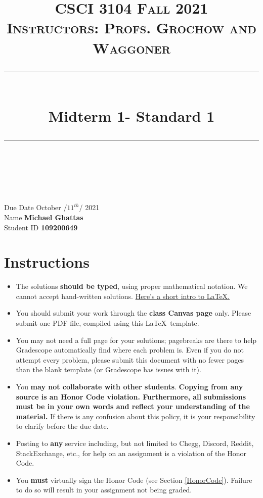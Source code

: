 \documentclass[11pt]{article}
\title{
\normalfont \normalsize 
\textsc{CSCI 3104 Fall 2021 \\ 
Instructors: Profs. Grochow and Waggoner} \\
[10pt] 
\rule{\linewidth}{0.5pt} \\[6pt] 
\huge Midterm 1- Standard 1 \\
\rule{\linewidth}{2pt}  \\[10pt]
}
\date{}
\theoremstyle{definition}
\theoremstyle{definition}
\theoremstyle{definition}
\begin{document}
\maketitle


\noindent
Due Date \dotfill October /$11^{th}$/ 2021 \\
Name \dotfill \textbf{Michael Ghattas} \\
Student ID \dotfill \textbf{109200649} \\


\tableofcontents

\section{Instructions}
 \begin{itemize}
	\item The solutions \textbf{should be typed}, using proper mathematical notation. We cannot accept hand-written solutions. \href{http://ece.uprm.edu/~caceros/latex/introduction.pdf}{Here's a short intro to \LaTeX.}
	\item You should submit your work through the \textbf{class Canvas page} only. Please submit one PDF file, compiled using this \LaTeX \ template.
	\item You may not need a full page for your solutions; pagebreaks are there to help Gradescope automatically find where each problem is. Even if you do not attempt every problem, please submit this document with no fewer pages than the blank template (or Gradescope has issues with it).

	\item You \textbf{may not collaborate with other students}. \textbf{Copying from any source is an Honor Code violation. Furthermore, all submissions must be in your own words and reflect your understanding of the material.} If there is any confusion about this policy, it is your responsibility to clarify before the due date. 

	\item Posting to \textbf{any} service including, but not limited to Chegg, Discord, Reddit, StackExchange, etc., for help on an assignment is a violation of the Honor Code.

	\item You \textbf{must} virtually sign the Honor Code (see Section \ref{HonorCode}). Failure to do so will result in your assignment not being graded.
\end{itemize}
\end{document}
